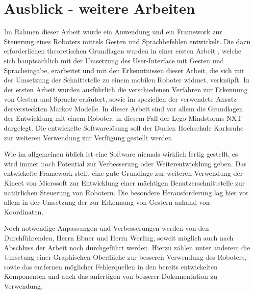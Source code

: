 \chapter{Ausblick - weitere Arbeiten}
\label{chap:Ausblick}

Im Rahmen dieser Arbeit wurde ein Anwendung und ein Framework zur Steuerung eines Roboters mittels Gesten und Sprachbefehlen entwickelt. Die dazu erforderlichen theoretischen Grundlagen wurden in einer ersten Arbeit \cite{bib:Ebner_Werling}, welche sich haupts\"achlich mit der Umsetzung des User-Interface mit Gesten und Spracheingabe, erarbeitet und mit den Erkenntnissen dieser Arbeit, die sich mit der Umsetzung der Schnittstelle zu einem mobilen Roboter widmet, verkn\"upft. In der ersten Arbeit wurden ausf\"uhrlich die verschiedenen Verfahren zur Erkennung von Gesten und Sprache erl\"autert, sowie im speziellen der verwendete Ansatz derversteckten Markov Modelle. In dieser Arbeit sind vor allem die Grundlagen der Entwicklung mit einem Roboter, in diesem Fall der Lego Mindstorms NXT dargelegt. Die entwickelte Softwarel\"osung soll der Dualen Hochschule Karlsruhe zur weiteren Verwendung zur Verf\"ugung gestellt werden. 
\par\smallskip
Wie im allgemeinen \"ublich ist eine Software niemals wirklich fertig gestellt, es wird immer noch Potential zur Verbesserung oder Weiterentwicklung geben. Das entwickelte Framework stellt eine gute Grundlage zur weiteren Verwendung der Kinect von Microsoft zur Entwicklung einer m\"achtigen Benutzerschnittstelle zur nat\"urlichen Steuerung von Robotern. Die besondere Herausforderung lag hier vor allem in der Umsetzung der  zur Erkennung von Gestern anhand von Koordinaten.
\par\smallskip
Noch notwendige Anpassungen und Verbesserungen werden von den Durchf\"uhrenden, Herrn Ebner und Herrn Werling, soweit m\"oglich auch nach Abschluss der Arbeit noch durchgef\"uhrt werden. Hierzu z\"ahlen unter anderem die Umsetung einer Graphischen Oberfl\"ache zur besseren Verwendung des Roboters, sowie das entfernen m\"oglicher Fehlerquellen in den bereits entwickelten Komponenten und auch das anfertigen von besserer Dokumentation zu Verwendung.